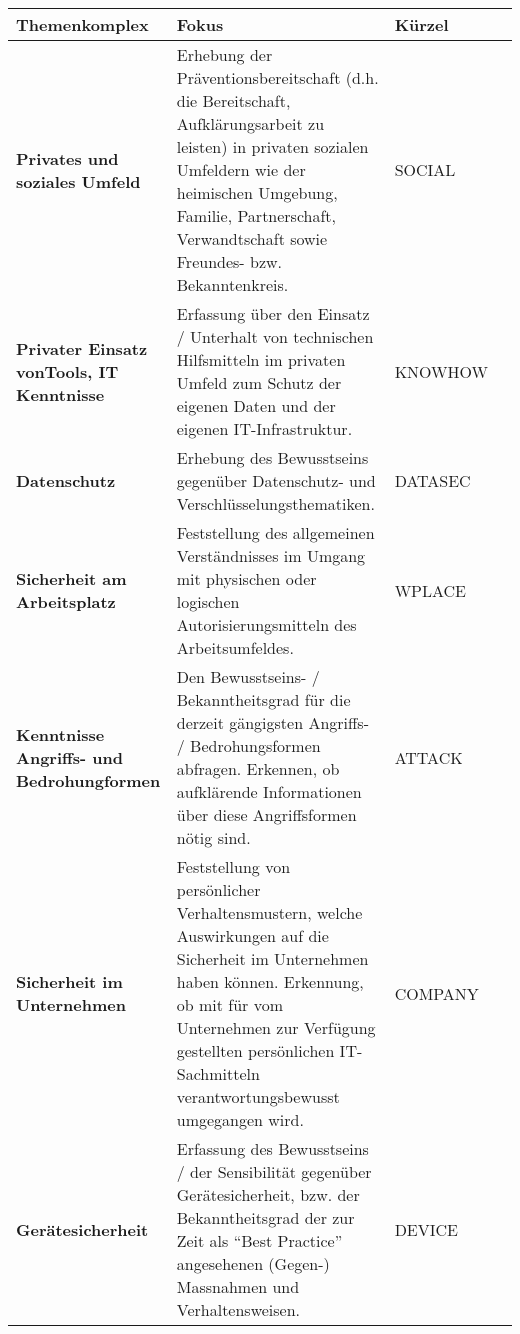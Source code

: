 \documentclass[../../main.tex]{subfiles}
\begin{document}
\begin{table}[H]
\begin{tabular}{ |p{4cm}|p{10.5cm}|p{2.0cm}|p{1.5cm}|}
\hline
\tableheaderbgcolor
\textbf{Themenkomplex} & \textbf{Fokus} & \textbf{Kürzel}\\ 
\hline
\textbf{Privates und \newline soziales Umfeld} & Erhebung der Präventionsbereitschaft (d.h. die Bereitschaft, Aufklärungsarbeit zu leisten) in privaten sozialen Umfeldern wie der heimischen Umgebung, Familie, Partnerschaft, Verwandtschaft sowie Freundes- bzw. Bekanntenkreis. & SOCIAL \\
\hline
\textbf{Privater Einsatz von\newline Tools, IT Kenntnisse} & Erfassung über den Einsatz / Unterhalt von technischen Hilfsmitteln im privaten Umfeld zum Schutz der eigenen Daten und der eigenen IT-Infrastruktur. & KNOWHOW \\
\hline
\textbf{Datenschutz} & Erhebung des Bewusstseins gegenüber Datenschutz- und Verschlüsselungsthematiken. & DATASEC \\
\hline
\textbf{Sicherheit am \newline Arbeitsplatz} & Feststellung des allgemeinen Verständnisses im Umgang mit physischen oder logischen Autorisierungsmitteln des Arbeitsumfeldes. & WPLACE \\
\hline
\textbf{Kenntnisse Angriffs- \newline und Bedrohungformen} & Den Bewusstseins- / Bekanntheitsgrad für die derzeit gängigsten Angriffs- / Bedrohungsformen abfragen. Erkennen, ob aufklärende Informationen über diese Angriffsformen nötig sind. & ATTACK \\
\hline
\textbf{Sicherheit im \newline Unternehmen} & Feststellung von persönlicher Verhaltensmustern, welche Auswirkungen auf die Sicherheit im Unternehmen haben können. Erkennung, ob mit für vom Unternehmen zur Verfügung gestellten persönlichen IT-Sachmitteln verantwortungsbewusst umgegangen wird. & COMPANY \\
\hline
\textbf{Gerätesicherheit} & Erfassung des Bewusstseins / der Sensibilität gegenüber Gerätesicherheit, bzw. der Bekanntheitsgrad der zur Zeit als "`Best Practice"' angesehenen (Gegen-) Massnahmen und Verhaltensweisen. & DEVICE \\
\hline

\end{tabular}
\end{table}
\end{document}
